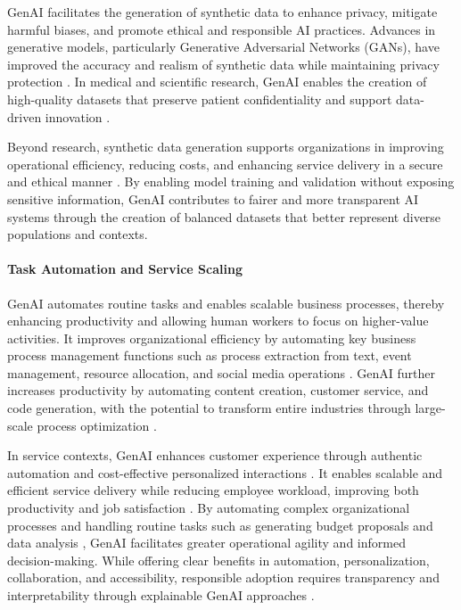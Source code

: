GenAI facilitates the generation of synthetic data to enhance privacy, mitigate harmful biases, and promote ethical and responsible AI practices. Advances in generative models, particularly Generative Adversarial Networks (GANs), have improved the accuracy and realism of synthetic data while maintaining privacy protection \parencite{S07}. In medical and scientific research, GenAI enables the creation of high-quality datasets that preserve patient confidentiality and support data-driven innovation \parencite{S13}.

Beyond research, synthetic data generation supports organizations in improving operational efficiency, reducing costs, and enhancing service delivery in a secure and ethical manner \parencite{R08}. By enabling model training and validation without exposing sensitive information, GenAI contributes to fairer and more transparent AI systems through the creation of balanced datasets that better represent diverse populations and contexts.

\paragraph{Task Automation and Service Scaling}
GenAI automates routine tasks and enables scalable business processes, thereby enhancing productivity and allowing human workers to focus on higher-value activities. It improves organizational efficiency \parencite{R03} by automating key business process management functions such as process extraction from text, event management, resource allocation, and social media operations \parencite{R04}. GenAI further increases productivity by automating content creation, customer service, and code generation, with the potential to transform entire industries through large-scale process optimization \parencite{R04}.

In service contexts, GenAI enhances customer experience through authentic automation and cost-effective personalized interactions \parencite{R08}. It enables scalable and efficient service delivery while reducing employee workload, improving both productivity and job satisfaction \parencite{R08}. By automating complex organizational processes \parencite{R09} and handling routine tasks such as generating budget proposals \parencite{S01} and data analysis \parencite{S14}, GenAI facilitates greater operational agility and informed decision-making. While offering clear benefits in automation, personalization, collaboration, and accessibility, responsible adoption requires transparency and interpretability through explainable GenAI approaches \parencite{S18}.


